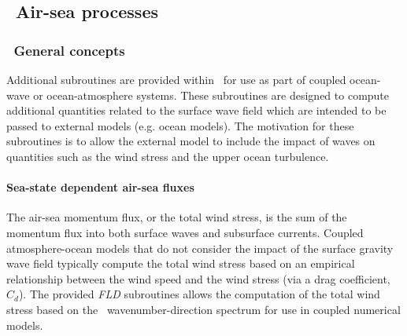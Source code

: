 \vssub
\subsection{~Air-sea processes}
\vsssub
\subsubsection{~General concepts}
\vsssub

Additional subroutines are provided within \ws\ for use as part of coupled ocean-wave or ocean-atmosphere systems.
These subroutines are designed to compute additional quantities related to the surface wave field which are intended to be passed to external models (e.g. ocean models).
The motivation for these subroutines is to allow the external model to include the impact of waves on quantities such as the wind stress and the upper ocean turbulence.

\paragraph{Sea-state dependent air-sea fluxes}

The air-sea momentum flux, or the total wind stress, is the sum of the momentum flux into both surface waves and subsurface currents.
Coupled atmosphere-ocean models that do not consider the impact of the surface gravity wave field typically compute the total wind stress based on an empirical relationship between the wind speed and the wind stress (via a drag coefficient, $C_d$).
The provided {\it FLD} subroutines allows the computation of the total wind stress based on the \ws\ wavenumber-direction spectrum for use in coupled numerical models.

